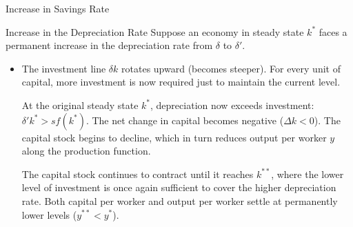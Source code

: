 \documentclass[10pt,aspectratio=169]{beamer}
\begin{document}
\begin{frame}{Increase in Savings Rate}
\begin{center}
\end{center}
\end{frame}



\begin{frame}{Increase in the Depreciation Rate}
Suppose an economy in steady state $k^*$ faces a permanent increase in the depreciation rate from $\delta$ to $\delta'$.

\begin{itemize}
    \item The investment line $\delta k$ rotates upward (becomes steeper). For every unit of capital, more investment is now required just to maintain the current level.


        \itemvso At the original steady state $k^*$, depreciation now exceeds investment: $\delta' k^* > sf(k^*)$.
        \itemvso The net change in capital becomes negative ($\Delta k < 0$).
        \itemvso The capital stock begins to decline, which in turn reduces output per worker $y$ along the production function.

    \itemvso  The capital stock continues to contract until it reaches $k^{**}$, where the lower level of investment is once again sufficient to cover the higher depreciation rate.
    \itemvso  Both capital per worker and output per worker settle at permanently lower levels ($y^{**} < y^*$).
\end{itemize}
\end{frame}
\end{document}
